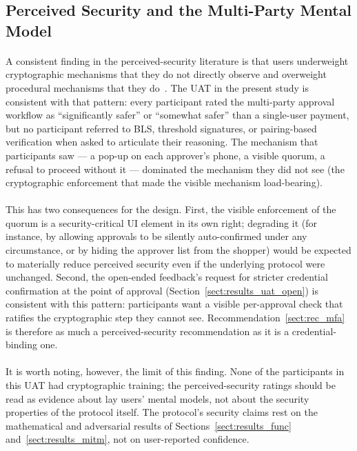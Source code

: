 \subsection{Perceived Security and the Multi-Party Mental Model}
\label{sect:disc_perceived}

\paragraph{}A consistent finding in the perceived-security literature is that users underweight cryptographic mechanisms that they do not directly observe and overweight procedural mechanisms that they do~\cite{krombholz2014}. The UAT in the present study is consistent with that pattern: every participant rated the multi-party approval workflow as ``significantly safer'' or ``somewhat safer'' than a single-user payment, but no participant referred to BLS, threshold signatures, or pairing-based verification when asked to articulate their reasoning. The mechanism that participants saw --- a pop-up on each approver's phone, a visible quorum, a refusal to proceed without it --- dominated the mechanism they did not see (the cryptographic enforcement that made the visible mechanism load-bearing).

\paragraph{}This has two consequences for the design. First, the visible enforcement of the quorum is a security-critical UI element in its own right; degrading it (for instance, by allowing approvals to be silently auto-confirmed under any circumstance, or by hiding the approver list from the shopper) would be expected to materially reduce perceived security even if the underlying protocol were unchanged. Second, the open-ended feedback's request for stricter credential confirmation at the point of approval (Section~\ref{sect:results_uat_open}) is consistent with this pattern: participants want a visible per-approval check that ratifies the cryptographic step they cannot see. Recommendation~\ref{sect:rec_mfa} is therefore as much a perceived-security recommendation as it is a credential-binding one.

\paragraph{}It is worth noting, however, the limit of this finding. None of the participants in this UAT had cryptographic training; the perceived-security ratings should be read as evidence about lay users' mental models, not about the security properties of the protocol itself. The protocol's security claims rest on the mathematical and adversarial results of Sections~\ref{sect:results_func} and~\ref{sect:results_mitm}, not on user-reported confidence.

